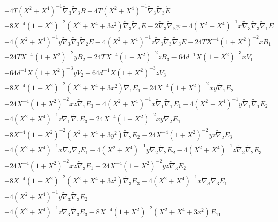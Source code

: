 \documentclass[10pt,letterpaper]{article}
\numberwithin{equation}{section}
\begin{document}
\begin{appendices}
\begin{eqnarray}
&& - 4 T (X^2 + X^4)^{-1} \tilde{\nabla}_{3}\tilde{\nabla}_{3}B + 4 T (X^2 + X^4)^{-1} \tilde{\nabla}_{3}\tilde{\nabla}_{3}\dot{E} \nonumber \\ 
&& - 8 X^{-4} (1 + X^2)^{-2} (X^2 + X^4 + 3 z^2) \tilde{\nabla}_{3}\tilde{\nabla}_{3}E - 2 \tilde{\nabla}_{3}\tilde{\nabla}_{3}\psi - 4 (X^2 + X^4)^{-1} x \tilde{\nabla}_{3}\tilde{\nabla}_{3}\tilde{\nabla}_{1}E \nonumber \\ 
&& - 4 (X^2 + X^4)^{-1} y \tilde{\nabla}_{3}\tilde{\nabla}_{3}\tilde{\nabla}_{2}E - 4 (X^2 + X^4)^{-1} z \tilde{\nabla}_{3}\tilde{\nabla}_{3}\tilde{\nabla}_{3}E-24 T X^{-4} (1 + X^2)^{-2} x B_{1} \nonumber \\ 
&& - 24 T X^{-4} (1 + X^2)^{-2} y B_{2} - 24 T X^{-4} (1 + X^2)^{-2} z B_{3} - 64 d^{-1} X (1 + X^2)^{-3} x V_{1} \nonumber \\ 
&& - 64 d^{-1} X (1 + X^2)^{-3} y V_{2} - 64 d^{-1} X (1 + X^2)^{-3} z V_{3} \nonumber \\ 
&& - 8 X^{-4} (1 + X^2)^{-2} (X^2 + X^4 + 3 x^2) \tilde{\nabla}_{1}E_{1} - 24 X^{-4} (1 + X^2)^{-2} x y \tilde{\nabla}_{1}E_{2} \nonumber \\ 
&& - 24 X^{-4} (1 + X^2)^{-2} x z \tilde{\nabla}_{1}E_{3} - 4 (X^2 + X^4)^{-1} x \tilde{\nabla}_{1}\tilde{\nabla}_{1}E_{1} - 4 (X^2 + X^4)^{-1} y \tilde{\nabla}_{1}\tilde{\nabla}_{1}E_{2} \nonumber \\ 
&& - 4 (X^2 + X^4)^{-1} z \tilde{\nabla}_{1}\tilde{\nabla}_{1}E_{3} - 24 X^{-4} (1 + X^2)^{-2} x y \tilde{\nabla}_{2}E_{1} \nonumber \\ 
&& - 8 X^{-4} (1 + X^2)^{-2} (X^2 + X^4 + 3 y^2) \tilde{\nabla}_{2}E_{2} - 24 X^{-4} (1 + X^2)^{-2} y z \tilde{\nabla}_{2}E_{3} \nonumber \\ 
&& - 4 (X^2 + X^4)^{-1} x \tilde{\nabla}_{2}\tilde{\nabla}_{2}E_{1} - 4 (X^2 + X^4)^{-1} y \tilde{\nabla}_{2}\tilde{\nabla}_{2}E_{2} - 4 (X^2 + X^4)^{-1} z \tilde{\nabla}_{2}\tilde{\nabla}_{2}E_{3} \nonumber \\ 
&& - 24 X^{-4} (1 + X^2)^{-2} x z \tilde{\nabla}_{3}E_{1} - 24 X^{-4} (1 + X^2)^{-2} y z \tilde{\nabla}_{3}E_{2} \nonumber \\ 
&& - 8 X^{-4} (1 + X^2)^{-2} (X^2 + X^4 + 3 z^2) \tilde{\nabla}_{3}E_{3} - 4 (X^2 + X^4)^{-1} x \tilde{\nabla}_{3}\tilde{\nabla}_{3}E_{1} \nonumber \\ 
&& - 4 (X^2 + X^4)^{-1} y \tilde{\nabla}_{3}\tilde{\nabla}_{3}E_{2} \nonumber \\ 
&& - 4 (X^2 + X^4)^{-1} z \tilde{\nabla}_{3}\tilde{\nabla}_{3}E_{3}-8 X^{-4} (1 + X^2)^{-2} (X^2 + X^4 + 3 x^2) E_{11} \nonumber \\ 

\end{eqnarray}
\end{appendices}
\end{document}
